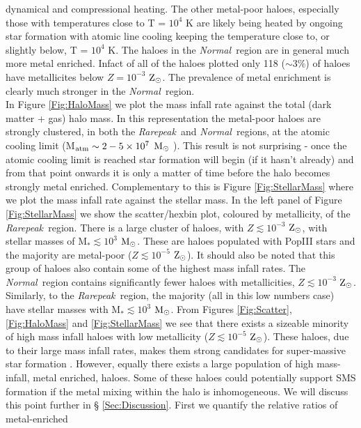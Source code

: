 \documentclass[graphics, twocolumn, usenatbib]{mn2e}
\newcommand{\msolar} {$\rm{M_{\odot}}~$}
\newcommand{\msolarc} {$\rm{M_{\odot}}$}
\newcommand{\zsolarc} {$\rm{Z_{\odot}}$}
\newcommand{\rarepeak} {\textit{Rarepeak~}}
\newcommand{\normal} {\textit{Normal~}}
\begin{document}
dynamical and compressional heating. The other metal-poor haloes, especially those with temperatures
close to T = $10^4$ K are likely being heated by ongoing star formation with atomic line
cooling keeping the temperature close to, or slightly below, T = $10^4$ K. 
The haloes in the \normal region are in general much more metal enriched. Infact of
all of the haloes plotted only 118 ($\sim 3$\%) of  haloes have metallicites
below  $Z = 10^{-3}$ \zsolarc. The prevalence of metal enrichment is clearly much stronger in
the \normal region.\\
\indent In Figure \ref{Fig:HaloMass} we plot the mass infall rate against the total (dark matter
+ gas) halo mass. In this representation the metal-poor haloes are strongly clustered, in both
the \rarepeak and \normal regions, at the atomic cooling limit (M$_{\rm atm} \sim 2 - 5 \times 10^7$
\msolar). This result is not surprising - once the atomic cooling limit is reached star formation
will begin (if it hasn't already) and from that point onwards it is only a matter of time before
the halo becomes strongly metal enriched. Complementary to this is Figure \ref{Fig:StellarMass}
where we plot the mass infall rate against the stellar mass. In the left panel of Figure
\ref{Fig:StellarMass} we show the scatter/hexbin plot, coloured by metallicity, of the
\rarepeak region. There is a large cluster of haloes, with $Z \lesssim 10^{-3}$ \zsolarc,
with stellar masses of M$_{*} \lesssim 10^3$ \msolarc. These are haloes
populated with PopIII stars and the majority are metal-poor ($Z \lesssim 10^{-5}$ \zsolarc).
It should also be noted that this group of haloes also contain some of the highest mass infall
rates. The \normal region contains significantly fewer haloes with metallicities,
$Z \lesssim 10^{-3}$ \zsolarc. Similarly, to the \rarepeak region, the majority (all in this
low numbers case) have stellar masses with
M$_{*} \lesssim 10^3$ \msolarc.  From Figures \ref{Fig:Scatter}, \ref{Fig:HaloMass}
and \ref{Fig:StellarMass} we see that there exists a sizeable minority of high mass infall haloes
with low metallicity ($Z \lesssim 10^{-5}$ \zsolarc). These
haloes, due to their large mass infall rates, makes them strong candidates for super-massive
star formation \citep{Woods_2018, Chon_2020}. However, equally there exists a large population of
high mass-infall, metal enriched, haloes. Some of these haloes could potentially support SMS formation
if the metal mixing within the halo is inhomogeneous. We will discuss this point further in \S
\ref{Sec:Discussion}. First we quantify the relative ratios of metal-enriched
\end{document}
